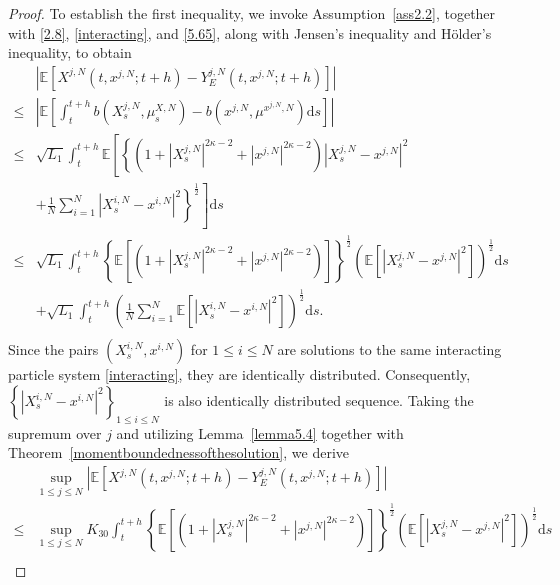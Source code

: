 \documentclass[12pt]{article}
\numberwithin{equation}{section}
\begin{document}
\begin{proof} To establish the first inequality, we invoke Assumption~\ref{ass2.2}, together with \eqref{2.8}, \eqref{interacting}, and \eqref{5.65}, along with Jensen's inequality and H\"older's inequality, to obtain
\begin{equation}\tag{5.98}\label{5.69}
\begin{aligned}
&\left|\mathbb{E}\left[X^{j,N}\left(t, x^{j,N} ; t+h\right)-Y^{j,N}_E\left(t, x^{j,N} ; t+h\right)\right]\right|\\
\leq& \left|\mathbb{E}\left[\int_t^{t+h} b\left({X}^{j,N}_s,\mu^{X,N}_s\right)-b\left( x^{j,N},\mu ^{x^{j,N},N} \right) \mathrm{d} s\right]\right|\\
\leq & \sqrt{L_1} \int_t^{t+h} \mathbb{E}\left[ \left\{\left( 1+\left|X_{s}^{j,N}\right|^{2\kappa -2}+\left|x^{j,N}\right|^{2\kappa -2} \right) \left|X_{s}^{j,N}-x^{j,N}\right|^2\right.\right.\\
&+\left.\left.\tfrac{1}{N}\sum_{i=1}^N{\left|X_{s}^{i,N}-x^{i,N}\right|^2}\right\}^{\frac{1}{2}}\right] \mathrm{d} s\\
\leq & \sqrt{L_1} \int_t^{t+h} \left\{\mathbb{E}\left[  \left(1+\left|X_{s}^{j,N}\right|^{2\kappa -2}+\left|x^{j,N}\right|^{2\kappa -2}\right)\right]\right\}^{\frac{1}{2}} \left(\mathbb{E}\left[\left|X_{s}^{j,N}-x^{j,N}\right|^{2}\right]\right)^{\frac{1}{2}}\mathrm{d} s\\
 &+ \sqrt{L_1} \int_t^{t+h} \left(\tfrac{1}{N}\sum_{i=1}^N{\mathbb{E}\left[\left|X_{s}^{i,N}-x^{i,N}\right|^2\right]}\right) ^{\frac{1}{2}}\mathrm{d} s.\\
\end{aligned}
\end{equation}
Since the pairs $\left(X_s^{i,N}, x^{i,N}\right)$ for $1 \leq i \leq N$ are solutions to the same interacting particle system \eqref{interacting}, they are identically distributed. Consequently, $\left\{\left|X_s^{i,N} - x^{i,N}\right|^2\right\}_{1 \leq i \leq N}$ is also identically distributed sequence. Taking the supremum over $j$ and utilizing Lemma~\ref{lemma5.4} together with Theorem~\ref{momentboundednessofthesolution}, we derive
\begin{equation}\tag{5.99}\label{5.71}
\begin{aligned}
&\underset{1\leq j\leq N}{\sup}\left|\mathbb{E}\left[X^{j,N}\left(t, x^{j,N} ; t+h\right)-Y^{j,N}_E\left(t, x^{j,N} ; t+h\right)\right]\right|\\
\leq&  \underset{1\leq j\leq N}{\sup} K_{30} \int_t^{t+h} \left\{\mathbb{E}\left[  \left(1+\left|X_{s}^{j,N}\right|^{2\kappa -2}+\left|x^{j,N}\right|^{2\kappa -2}\right)\right]\right\}^{\frac{1}{2}} \left(\mathbb{E}\left[\left|X_{s}^{j,N}-x^{j,N}\right|^{2}\right]\right)^{\frac{1}{2}}\mathrm{d} s\\

\end{aligned}
\end{equation}
\end{proof}
\end{document}
